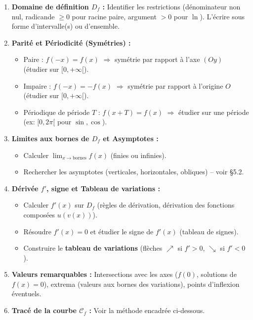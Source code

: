 \documentclass[11pt]{article}
\begin{document}
\begin{methode}
\begin{enumerate}
    \item \textbf{Domaine de définition $D_f$ :} Identifier les restrictions (dénominateur non nul, radicande $\ge 0$ pour racine paire, argument $>0$ pour $\ln$). L'écrire sous forme d'intervalle(s) ou d'ensemble.
    \item \textbf{Parité et Périodicité (Symétries) :}
    \begin{itemize}
        \item Paire : $f(-x)=f(x)$ $\Rightarrow$ symétrie par rapport à l'axe $(Oy)$ (étudier sur $[0,+\infty[$).
        \item Impaire : $f(-x)=-f(x)$ $\Rightarrow$ symétrie par rapport à l'origine $O$ (étudier sur $[0,+\infty[$).
        \item Périodique de période $T$ : $f(x+T)=f(x)$ $\Rightarrow$ étudier sur une période (ex: $[0, 2\pi[$ pour $\sin, \cos$).
    \end{itemize}
    \item \textbf{Limites aux bornes de $D_f$ et Asymptotes :}
    \begin{itemize}
        \item Calculer $\lim_{x \to \text{bornes}} f(x)$ (finies ou infinies).
        \item Rechercher les asymptotes (verticales, horizontales, obliques) -- voir \S 5.2.
    \end{itemize}
    \item \textbf{Dérivée $f'$, signe et Tableau de variations :}
    \begin{itemize}
        \item Calculer $f'(x)$ sur $D_f$ (règles de dérivation, dérivation des fonctions composées $u(v(x))$).
        \item Résoudre $f'(x)=0$ et étudier le signe de $f'(x)$ (tableau de signes).
        \item Construire le \textbf{tableau de variations} (flèches $\nearrow$ si $f'>0$, $\searrow$ si $f'<0$).
    \end{itemize}
    \item \textbf{Valeurs remarquables :} Intersections avec les axes ($f(0)$, solutions de $f(x)=0$), extrema (valeurs aux bornes des variations), points d'inflexion éventuels.
    \item \textbf{Tracé de la courbe $\mathcal{C}_f$ :} Voir la méthode encadrée ci-dessous.
\end{enumerate}
\end{methode}
\end{document}
